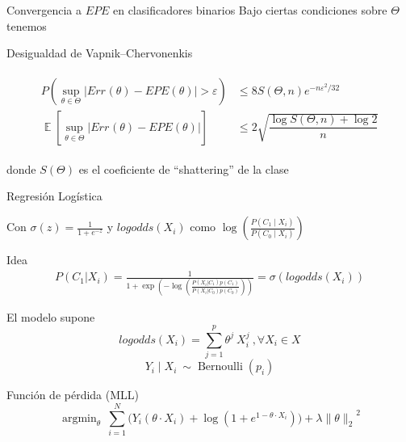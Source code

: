\documentclass[xcolor=x11names]{beamer}
\DeclareMathOperator{\Expect}{\mathbb{E}}
\DeclareMathOperator{\trainsetn}{\mathcal{T}^{(n)}}
\begin{document}

\begin{frame}{Convergencia a $EPE$ en clasificadores binarios}
Bajo ciertas condiciones sobre $\Theta$ tenemos
	\begin{block}{Desigualdad de Vapnik–Chervonenkis}

		\begin{align*}
			\begin{split}
				P\left(\sup_{\theta\in \Theta}\left|Err_{\trainsetn}(\theta)-EPE (\theta)\right|>\varepsilon \right) & \leq
				8S (\Theta,n) e^{{-n \varepsilon^{2}/32}}\\
				\Expect\left[\sup_{\theta \in \Theta}\left| Err_{\trainsetn}(\theta)-EPE (\theta)\right|\right] &
				\leq 2\sqrt{\dfrac{\log S(\Theta,n)+\log2}{n}}
			\end{split}
		\end{align*}

	\end{block}
	donde $S(\Theta)$ es el coeficiente de ``shattering'' de la clase
\end{frame}


\begin{frame}[shrink=5]{Regresión Logística}

Con $\sigma(z) = \frac{1}{1 + e^{-z}}$ y $logodds(X_i)$ como $\log \left(  \frac{ P(C_1 \mid X_i)}{P(C_0 \mid X_i ) } \right)$
	\begin{block}{Idea}
	\footnotesize
		\begin{align*}
			P(C_1| X_i)  = \frac{1}{1 + \exp \left(- \log \left(  \frac{ P(X_i|C_1)p(C_1)}{P(X_i|C_0)p(C_0)} \right) \right)} = \sigma\left(logodds(X_i)\right)
		\end{align*}

		El modelo supone
		$$logodds(X_i) = \sum_{j=1}^p \theta^j \ X_i^j  \ , \forall X_i \in X $$
		$$Y_i \mid X_i \ \sim \operatorname{Bernoulli}(p_i)$$

	\end{block}

	\begin{block}{Función de pérdida (MLL)}
		$$\operatorname{argmin}_{\theta} \ \sum_{i=1}^N \big(Y_i ( \theta \cdot X_i ) + \log(1 + e^{1- \theta \cdot X_i} ) \big) + \lambda { \| \theta \|_{2}}^2$$
	\end{block}
\end{frame}
\end{document}
